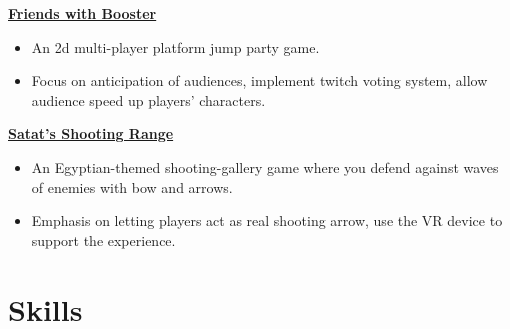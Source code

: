 \documentclass{article}
\begin{document}
{\begin{itemize}
			
			
		\end{itemize}
		\textbf{\href{http://www.plutoshe.com/blog/BoosterBitchfwb}{Friends with Booster}} \hfill \quad
		
		\begin{itemize}
			\item An 2d multi-player platform jump party game.
			\item Focus on anticipation of audiences, implement twitch voting system, allow audience speed up players' characters.
		\end{itemize}
	
		\textbf{\href{http://www.plutoshe.com/blog/Satat'sShootingRange}{Satat's Shooting Range}} \hfill \quad
		
		\begin{itemize}
			\item An Egyptian-themed shooting-gallery game where you defend against waves of enemies with bow and arrows.
			\item Emphasis on letting players act as real shooting arrow, use the VR device to support the experience.
		\end{itemize}
		
		
		
		
		
		
		

		
		
		\vspace{10pt}
		\section{Skills}
				\hspace{0.3in}
				
				\hspace{0.3in}

		\hspace{0.3in}
		
	
		
		
		
		
}
\end{document}
